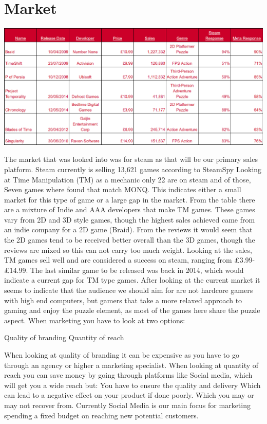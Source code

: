 \documentclass{scrartcl}
\begin{document}
\section{Market}
\begin{center}
	\includegraphics[scale=0.4]{ResearchChart}	
	\newline
\end{center}


The market that was looked into was for steam as that will be our primary sales platform.
Steam currently is selling 13,621 games according to SteamSpy
Looking at Time Manipulation (TM) as a mechanic only 22 are on steam and of those, Seven games where found that match MONQ.
This indicates either a small market for this type of game or a large gap in the market.
From the table there are a mixture of Indie and AAA developers that make TM games.
These games vary from 2D and 3D style games, though the highest sales achieved came from an indie company for a 2D game (Braid).
From the reviews it would seem that the 2D games tend to be received better overall than the 3D games, though the reviews are mixed so this can not carry too much weight.
Looking at the sales, TM games sell well and are considered a success on steam, ranging from £3.99-£14.99.
The last similar game to be released was back in 2014, which would indicate a current gap for TM type games.
After looking at the current market it seems to indicate that the audience we should aim for are not hardcore gamers with high end computers, but gamers that take a more relaxed approach to gaming and enjoy the puzzle element, as most of the games here share the puzzle aspect.
\newline
\newline
\newline
\newline	
When marketing you have to look at two options:
\begin{center}
	Quality of branding
	\newline
	Quantity of reach
	\newline
\end{center}
When looking at quality of branding it can be expensive as you have to go through an agency or higher a marketing specialist.
When looking at quantity of reach you can save money by going through platforms like Social media, which will get you a wide reach but:
You have to ensure the quality and delivery 
Which can lead to a negative effect on your product if done poorly.
Which you may or may not recover from.
Currently Social Media is our main focus for marketing spending a fixed budget on reaching new potential customers.
\end{document}
